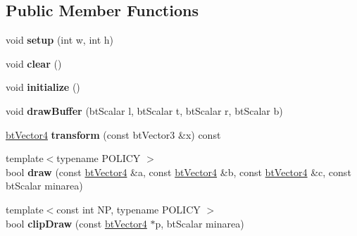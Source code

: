 \subsection*{Public Member Functions}
\begin{DoxyCompactItemize}
\item 
\hypertarget{struct_occlusion_buffer_a2fd79fae99c05ccb54d532ee82602e7d}{void {\bfseries setup} (int w, int h)}\label{struct_occlusion_buffer_a2fd79fae99c05ccb54d532ee82602e7d}

\item 
\hypertarget{struct_occlusion_buffer_a3d24210d43ee718b39adc4fbfda42ed1}{void {\bfseries clear} ()}\label{struct_occlusion_buffer_a3d24210d43ee718b39adc4fbfda42ed1}

\item 
\hypertarget{struct_occlusion_buffer_a835ad7db2ba936a9f18cff7de9b885a7}{void {\bfseries initialize} ()}\label{struct_occlusion_buffer_a835ad7db2ba936a9f18cff7de9b885a7}

\item 
\hypertarget{struct_occlusion_buffer_ac1186078cce0ad41cefe0deb43db1261}{void {\bfseries draw\+Buffer} (bt\+Scalar l, bt\+Scalar t, bt\+Scalar r, bt\+Scalar b)}\label{struct_occlusion_buffer_ac1186078cce0ad41cefe0deb43db1261}

\item 
\hypertarget{struct_occlusion_buffer_a4493cda4724a7fd173d6f7052da91eb8}{\hyperlink{classbt_vector4}{bt\+Vector4} {\bfseries transform} (const bt\+Vector3 \&x) const }\label{struct_occlusion_buffer_a4493cda4724a7fd173d6f7052da91eb8}

\item 
\hypertarget{struct_occlusion_buffer_a2ec3372fc2d8e33964be682a6ce050a3}{{\footnotesize template$<$typename P\+O\+L\+I\+C\+Y $>$ }\\bool {\bfseries draw} (const \hyperlink{classbt_vector4}{bt\+Vector4} \&a, const \hyperlink{classbt_vector4}{bt\+Vector4} \&b, const \hyperlink{classbt_vector4}{bt\+Vector4} \&c, const bt\+Scalar minarea)}\label{struct_occlusion_buffer_a2ec3372fc2d8e33964be682a6ce050a3}

\item 
\hypertarget{struct_occlusion_buffer_aae3d878ce142c4b7aebf64b44ca73f03}{{\footnotesize template$<$const int N\+P, typename P\+O\+L\+I\+C\+Y $>$ }\\bool {\bfseries clip\+Draw} (const \hyperlink{classbt_vector4}{bt\+Vector4} $\ast$p, bt\+Scalar minarea)}\label{struct_occlusion_buffer_aae3d878ce142c4b7aebf64b44ca73f03}


\end{DoxyCompactItemize}
